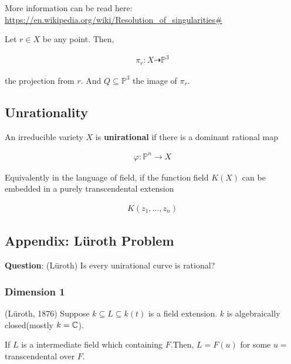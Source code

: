 \documentclass[Total.tex]{subfiles}
\begin{document}
		More information can be read here: \url{https://en.wikipedia.org/wiki/Resolution_of_singularities#}
		
		\begin{example}
			Let $r\in X$ be any point. Then, 
			
			\begin{gather*}
				\pi_r:X\dashrightarrow \mathbb{P}^3
			\end{gather*}
			
			the projection from $r$. And $Q\subseteq \mathbb{P}^3$ the image of $\pi_r$. 
		\end{example}
		
		
		\subsection{Unrationality}
		
		\begin{Def}
			An irreducible variety $X$ is \textbf{unirational} if  there is a dominant rational map
			
			\begin{gather*}
				\varphi:\mathbb{P}^n\rightarrow X
			\end{gather*}
		\end{Def}
		
		Equivalently in the language of field, if the function field $K(X)$ can be embedded in a purely transcendental extension
		
		\begin{gather*}
			K(z_1,\dots,z_n)
		\end{gather*}
		
		\subsection{Appendix: Lüroth Problem}
		
		\textbf{Question}: (Lüroth) Is every unirational curve is rational?
		
		\subsubsection{Dimension 1}
		
		\begin{theorem}
			(Lüroth, 1876) Suppose $k\subseteq L\subseteq k(t)$ is a field extension. $k$ is algebraically closed(mostly $k=\mathbb{C}$). 
			
			If $L$ is a intermediate field which containing  $F$.Then, $L=F(u)$ for some $u=$ transcendental over $F$.
		\end{theorem}
		
\end{document}
